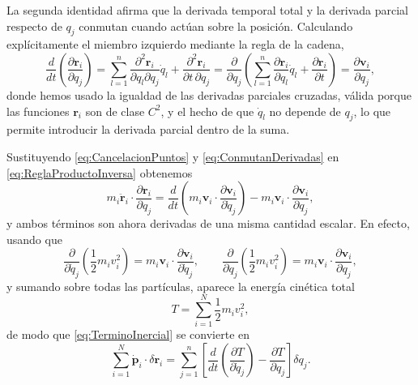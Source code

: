         La segunda identidad afirma que la derivada temporal total y la derivada parcial respecto de $q_{j}$ conmutan cuando actúan sobre la posición. Calculando explícitamente el miembro izquierdo mediante la regla de la cadena,
        \begin{equation}\label{eq:ConmutanDerivadas}
            \frac{d}{dt}\left(\frac{\partial\mathbf{r}_{i}}{\partial q_{j}}\right)
            = \sum_{l=1}^{n}\frac{\partial^{2}\mathbf{r}_{i}}{\partial q_{l}\partial q_{j}}\dot{q}_{l}
            + \frac{\partial^{2}\mathbf{r}_{i}}{\partial t\,\partial q_{j}}
            = \frac{\partial}{\partial q_{j}}\left(\sum_{l=1}^{n}\frac{\partial\mathbf{r}_{i}}{\partial q_{l}}\dot{q}_{l} + \frac{\partial\mathbf{r}_{i}}{\partial t}\right)
            = \frac{\partial\mathbf{v}_{i}}{\partial q_{j}},
        \end{equation}
        donde hemos usado la igualdad de las derivadas parciales cruzadas, válida porque las funciones $\mathbf{r}_{i}$ son de clase $C^{2}$, y el hecho de que $\dot{q}_{l}$ no depende de $q_{j}$, lo que permite introducir la derivada parcial dentro de la suma.

        Sustituyendo \eqref{eq:CancelacionPuntos} y \eqref{eq:ConmutanDerivadas} en \eqref{eq:ReglaProductoInversa} obtenemos
        \begin{equation}\label{eq:TerminoInercial2}
            m_{i}\ddot{\mathbf{r}}_{i}\cdot\frac{\partial\mathbf{r}_{i}}{\partial q_{j}}
            = \frac{d}{dt}\left(m_{i}\mathbf{v}_{i}\cdot\frac{\partial\mathbf{v}_{i}}{\partial\dot{q}_{j}}\right)
            - m_{i}\mathbf{v}_{i}\cdot\frac{\partial\mathbf{v}_{i}}{\partial q_{j}},
        \end{equation}
        y ambos términos son ahora derivadas de una misma cantidad escalar. En efecto, usando que
        \begin{equation}\label{eq:DerivadaCuadrado}
            \frac{\partial}{\partial\dot{q}_{j}}\left(\frac{1}{2}m_{i}v_{i}^{2}\right) = m_{i}\mathbf{v}_{i}\cdot\frac{\partial\mathbf{v}_{i}}{\partial\dot{q}_{j}},
            \qquad
            \frac{\partial}{\partial q_{j}}\left(\frac{1}{2}m_{i}v_{i}^{2}\right) = m_{i}\mathbf{v}_{i}\cdot\frac{\partial\mathbf{v}_{i}}{\partial q_{j}},
        \end{equation}
        y sumando sobre todas las partículas, aparece la energía cinética total
        \begin{equation}\label{eq:EnergiaCinetica}
            T = \sum_{i=1}^{N}\frac{1}{2}m_{i}v_{i}^{2},
        \end{equation}
        de modo que \eqref{eq:TerminoInercial} se convierte en
        \begin{equation}\label{eq:TerminoInercial3}
            \sum_{i=1}^{N}\dot{\mathbf{p}}_{i}\cdot\delta\mathbf{r}_{i}
            = \sum_{j=1}^{n}\left[\frac{d}{dt}\left(\frac{\partial T}{\partial\dot{q}_{j}}\right) - \frac{\partial T}{\partial q_{j}}\right]\delta q_{j} .
        \end{equation}

